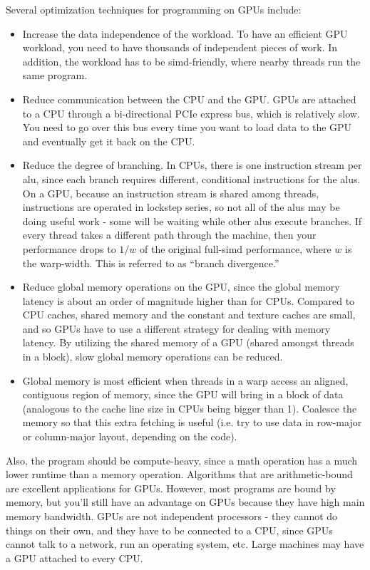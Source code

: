 \documentclass[10pt]{article}
\begin{document}
\begin{flushleft}
Several optimization techniques for programming on GPUs include:

\begin{itemize}
\item Increase the data independence of the workload. To have an efficient GPU workload, you need to have thousands of independent pieces of work. In addition, the workload has to be \gls{simd}-friendly, where nearby threads run the same program. 
\item Reduce communication between the CPU and the GPU. GPUs are attached to a CPU through a bi-directional PCIe express bus, which is relatively slow. You need to go over this bus every time you want to load data to the GPU and eventually get it back on the CPU.
\item Reduce the degree of branching. In CPUs, there is one instruction stream per \gls{alu}, since each branch requires different, conditional instructions for the \gls{alu}s. On a GPU, because an instruction stream is shared among threads, instructions are operated in lockstep series, so not all of the \gls{alu}s may be doing useful work - some will be waiting while other \gls{alu}s execute branches. If every thread takes a different path through the machine, then your performance drops to \(1/w\) of the original full-\gls{simd} performance, where \(w\) is the warp-width. This is referred to as ``branch divergence.''
\item Reduce global memory operations on the GPU, since the global memory latency is about an order of magnitude higher than for CPUs. Compared to CPU caches, shared memory and the constant and texture caches are small, and so GPUs have to use a different strategy for dealing with memory latency. By utilizing the shared memory of a GPU (shared amongst threads in a block), slow global memory operations can be reduced.
\item Global memory is most efficient when threads in a warp access an aligned, contiguous region of memory, since the GPU will bring in a block of data (analogous to the cache line size in CPUs being bigger than 1). Coalesce the memory so that this extra fetching is useful (i.e. try to use data in row-major or column-major layout, depending on the code). 
\end{itemize}

Also, the program should be compute-heavy, since a math operation has a much lower runtime than a memory operation. Algorithms that are arithmetic-bound are excellent applications for GPUs. However, most programs are bound by memory, but you'll still have an advantage on GPUs because they have high main memory bandwidth. GPUs are not independent processors - they cannot do things on their own, and they have to be connected to a CPU, since GPUs cannot talk to a network, run an operating system, etc. Large machines may have a GPU attached to every CPU. 







\end{flushleft}
\end{document}
